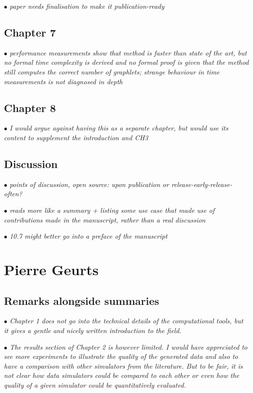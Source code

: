 \documentclass[10pt]{article}
\newcommand{\exam}[2][\  ]{\hspace{0pt}\marginpar{\color{red}#1}$\bullet$ \textit{#2}}
\newcommand{\imp}[1]{{\color{red} #1}}
\newcommand{\bigexclaim}{\raisebox{-0.1em}{\BigTriangleUp}\hspace{-0.32em}\llap{\small\textbf{!}}\hspace{0.32em}}
\newcommand{\tagimp}{\bigexclaim}
\begin{document}
{{\exam{paper needs finalisation to make it publication-ready}

\subsection{Chapter 7}

\exam{performance measurements show that method is faster than state of the art, but no formal time complexity is derived and no formal proof is given that the method still computes the correct number of graphlets; strange behaviour in time measurements is not diagnosed in depth}

\subsection{Chapter 8}

\exam{I would argue against having this as a separate chapter, but would use its content to supplement the introduction and CH3}

\subsection{Discussion}

\exam{points of discussion, open source: upon publication or release-early-release-often?}

\exam[\tagimp]{\imp{reads more like a summary} + listing some use case that made use of contributions made in the manuscript, rather than a real discussion}

\exam{10.7 might better go into a preface of the manuscript}

\section{Pierre Geurts}

\subsection{Remarks alongside summaries}
\exam{Chapter 1 does not go into the technical details of the computational tools, but it gives a gentle and nicely written introduction to the field.}

\exam{The results
	section of Chapter 2 is however limited. I would have appreciated to see more experiments to illustrate the
	quality of the generated data and also to have a comparison with other simulators from the
	literature. But to be fair, it is not clear how data simulators could be compared to each other or
	even how the quality of a given simulator could be quantitatively evaluated.}

}}
\end{document}
